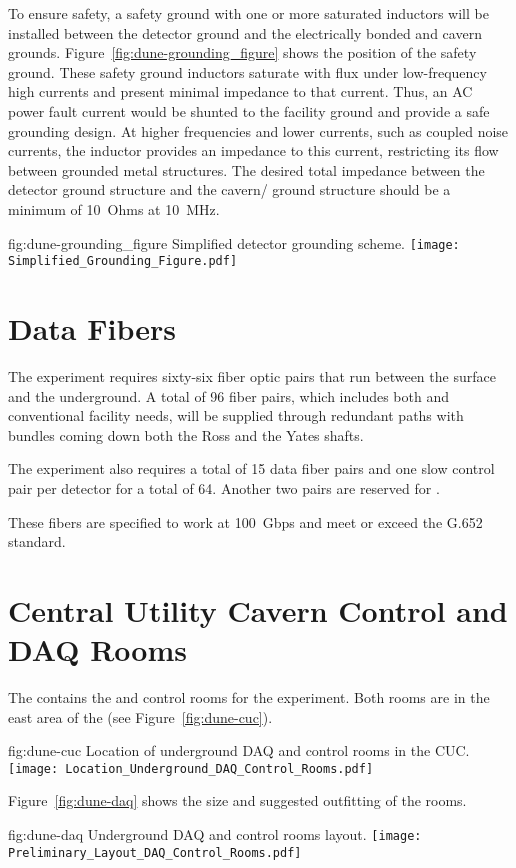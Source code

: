 To ensure safety, a safety ground with one or more saturated inductors
will be installed between the detector ground and the electrically
bonded  and cavern grounds.
Figure~\ref{fig:dune-grounding_figure} shows the position of the
safety ground. These safety ground inductors saturate with flux under
low-frequency high currents and present minimal impedance to that
current.  Thus, an AC power fault current would be shunted to the
facility ground and provide a safe grounding design. At higher
frequencies and lower currents, such as coupled noise currents, the
inductor provides an impedance to this current, restricting its flow
between grounded metal structures. The desired total impedance between
the detector ground structure and the cavern/ ground
structure should be a minimum of \SI{10}{Ohms} at \SI{10}{MHz}.
\begin{dunefigure}{fig:dune-grounding_figure}
  {Simplified detector grounding scheme.}
  \texttt{[image: Simplified\_Grounding\_Figure.pdf]}
\end{dunefigure}


\section{Data Fibers}
\label{sec:fdsp-coord-faci-fibers}


The  experiment requires sixty-six fiber
optic pairs that run between the surface and the underground.  A
total of 96 fiber pairs, which includes both  and conventional
facility needs, will be supplied through redundant paths with bundles
coming down both the Ross and the Yates shafts.


The experiment also requires a total of 15 data fiber pairs and
one slow control pair per detector for a total of 64.  Another
two pairs are reserved for .


These fibers are specified to work at 100~Gbps and meet or exceed the
G.652 standard.


\section{Central Utility Cavern Control and DAQ Rooms}
\label{sec:fdsp-coord-cuc-daq}


The  contains the  and control
rooms for the  experiment.  Both rooms are in the east
area of the  (see Figure~\ref{fig:dune-cuc}).  
\begin{dunefigure}{fig:dune-cuc}
  {Location of underground DAQ and control rooms in the CUC.}
  \texttt{[image: Location\_Underground\_DAQ\_Control\_Rooms.pdf]}
\end{dunefigure}
Figure~\ref{fig:dune-daq} shows the size and suggested outfitting of the rooms.
\begin{dunefigure}{fig:dune-daq}
  {Underground DAQ and control rooms layout.}
  \texttt{[image: Preliminary\_Layout\_DAQ\_Control\_Rooms.pdf]}
\end{dunefigure}


